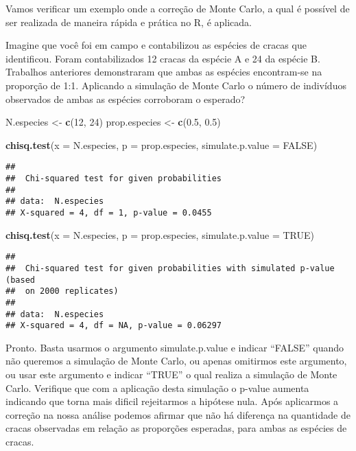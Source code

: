 \documentclass[]{book}
\newenvironment{Shaded}{\begin{snugshade}}{\end{snugshade}}
\newcommand{\DataTypeTok}[1]{\textcolor[rgb]{0.13,0.29,0.53}{#1}}
\newcommand{\DecValTok}[1]{\textcolor[rgb]{0.00,0.00,0.81}{#1}}
\newcommand{\FloatTok}[1]{\textcolor[rgb]{0.00,0.00,0.81}{#1}}
\newcommand{\KeywordTok}[1]{\textcolor[rgb]{0.13,0.29,0.53}{\textbf{#1}}}
\newcommand{\NormalTok}[1]{#1}
\newcommand{\OtherTok}[1]{\textcolor[rgb]{0.56,0.35,0.01}{#1}}
\newcommand{\StringTok}[1]{\textcolor[rgb]{0.31,0.60,0.02}{#1}}
\begin{document}
Vamos verificar um exemplo onde a correção de Monte Carlo, a qual é possível de ser realizada de maneira rápida e prática no R, é aplicada.

Imagine que você foi em campo e contabilizou as espécies de cracas que identificou. Foram contabilizados 12 cracas da espécie A e 24 da espécie B. Trabalhos anteriores demonstraram que ambas as espécies encontram-se na proporção de 1:1. Aplicando a simulação de Monte Carlo o número de indivíduos observados de ambas as espécies corroboram o esperado?

\begin{Shaded}
\begin{Highlighting}[]
\NormalTok{N.especies <-}\StringTok{ }\KeywordTok{c}\NormalTok{(}\DecValTok{12}\NormalTok{, }\DecValTok{24}\NormalTok{)}
\NormalTok{prop.especies <-}\StringTok{ }\KeywordTok{c}\NormalTok{(}\FloatTok{0.5}\NormalTok{, }\FloatTok{0.5}\NormalTok{)}

\KeywordTok{chisq.test}\NormalTok{(}\DataTypeTok{x =}\NormalTok{ N.especies, }\DataTypeTok{p =}\NormalTok{ prop.especies, }\DataTypeTok{simulate.p.value =} \OtherTok{FALSE}\NormalTok{)}
\end{Highlighting}
\end{Shaded}

\begin{verbatim}
## 
##  Chi-squared test for given probabilities
## 
## data:  N.especies
## X-squared = 4, df = 1, p-value = 0.0455
\end{verbatim}

\begin{Shaded}
\begin{Highlighting}[]
\KeywordTok{chisq.test}\NormalTok{(}\DataTypeTok{x =}\NormalTok{ N.especies, }\DataTypeTok{p =}\NormalTok{ prop.especies, }\DataTypeTok{simulate.p.value =} \OtherTok{TRUE}\NormalTok{)}
\end{Highlighting}
\end{Shaded}

\begin{verbatim}
## 
##  Chi-squared test for given probabilities with simulated p-value (based
##  on 2000 replicates)
## 
## data:  N.especies
## X-squared = 4, df = NA, p-value = 0.06297
\end{verbatim}

Pronto. Basta usarmos o argumento simulate.p.value e indicar ``FALSE'' quando não queremos a simulação de Monte Carlo, ou apenas omitirmos este argumento, ou usar este argumento e indicar ``TRUE'' o qual realiza a simulação de Monte Carlo. Verifique que com a aplicação desta simulação o p-value aumenta indicando que torna mais dificil rejeitarmos a hipótese nula. Após aplicarmos a correção na nossa análise podemos afirmar que não há diferença na quantidade de cracas observadas em relação as proporções esperadas, para ambas as espécies de cracas.
\end{document}
